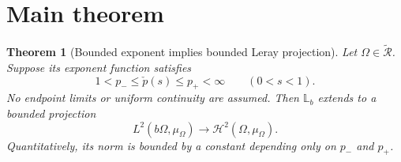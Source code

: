 \documentclass[11pt]{article}
\newtheorem{theorem}{Theorem}
\newcommand{\Lb}{\mathbb L_b}
\newcommand{\pcheck}{\check p}
\newcommand{\Rclass}{\widetilde{\mathcal R}}
\begin{document}
\section{Main theorem}

\begin{theorem}[Bounded exponent implies bounded Leray projection]
\label{thm:p-bounded}
Let \(\Omega\in\Rclass\).  Suppose its exponent function satisfies
\begin{equation}\label{eq:p-bounds}
 1<p_-\leq\pcheck(s)\leq p_+<\infty
 \qquad(0<s<1).
\end{equation}
No endpoint limits or uniform continuity are assumed.  Then \(\Lb\) extends
to a bounded projection
\[
 L^2(b\Omega,\mu_\Omega)\longrightarrow
 \mathcal H^2(\Omega,\mu_\Omega).
\]
Quantitatively, its norm is bounded by a constant depending only on
\(p_-\) and \(p_+\).
\end{theorem}
\end{document}
